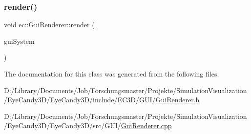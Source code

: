 \mbox{\label{classec_1_1_gui_renderer_af9573af245feb6ab252fb6c060344e7b}} 
\subsubsection{\texorpdfstring{render()}{render()}}
{\footnotesize\ttfamily void ec\+::\+Gui\+Renderer\+::render (\begin{DoxyParamCaption}\item[{const \mbox{\hyperlink{classec_1_1_gui_system}{Gui\+System}} \&}]{gui\+System }\end{DoxyParamCaption})}



The documentation for this class was generated from the following files\+:\begin{DoxyCompactItemize}
\item 
D\+:/\+Library/\+Documents/\+Job/\+Forschungsmaster/\+Projekte/\+Simulation\+Visualization/\+Eye\+Candy3\+D/\+Eye\+Candy3\+D/include/\+E\+C3\+D/\+G\+U\+I/\mbox{\hyperlink{_gui_renderer_8h}{Gui\+Renderer.\+h}}\item 
D\+:/\+Library/\+Documents/\+Job/\+Forschungsmaster/\+Projekte/\+Simulation\+Visualization/\+Eye\+Candy3\+D/\+Eye\+Candy3\+D/src/\+G\+U\+I/\mbox{\hyperlink{_gui_renderer_8cpp}{Gui\+Renderer.\+cpp}}\end{DoxyCompactItemize}

